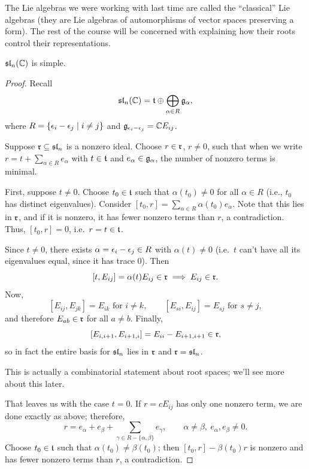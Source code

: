  The Lie algebras we were working with last time are called the
``classical'' Lie algebras (they are Lie algebras of automorphisms of vector
spaces preserving a form). The rest of the course will be concerned with
explaining how their roots control their representations.

\begin{proposition}
$\sl_n(\C)$ is simple.
\end{proposition}

\begin{proof}
Recall
\[
  \sl_n(\C) = \at \oplus \bigoplus_{\alpha \in R} \g_\alpha,
\]
where $R = \setc{\eps_i - \eps_j}{i \neq j}$ and $\g_{\eps_i - \eps_j} = \C E_{ij}$.

Suppose $\fr \subseteq \sl_n$ is a nonzero ideal. Choose $r \in \fr$,
$r \neq 0$, such that when we write $r = t + \sum_{\alpha \in R} e_\alpha$
with $t \in \at$ and $e_\alpha \in \g_\alpha$, the number of nonzero terms is
minimal.

First, suppose $t \neq 0$. Choose $t_0 \in \at$ such that $\alpha(t_0) \neq 0$
for all $\alpha \in R$ (i.e., $t_0$ has distinct eigenvalues). Consider
$[t_0, r] = \sum_{\alpha \in R} \alpha(t_0)e_\alpha$. Note that this lies in
$\fr$, and if it is nonzero, it has fewer nonzero terms than $r$, a
contradiction. Thus, $[t_0, r] = 0$, i.e.\ $r = t \in \at$.

Since $t \neq 0$, there exists $\alpha = \eps_i - \eps_j \in R$ with
$\alpha(t) \neq 0$ (i.e.\ $t$ can't have all its eigenvalues equal, since it
has trace $0$). Then
\[
  [t, E_{ij}] = \alpha(t)E_{ij} \in \fr \implies E_{ij} \in \fr.
\]
Now,
\[
  [E_{ij}, E_{jk}] = E_{ik} \text{ for } i \neq k, \qquad
  [E_{si}, E_{ij}] = E_{sj} \text{ for } s \neq j,
\]
and therefore $E_{ab} \in \fr$ for all $a \neq b$. Finally,
\[
  [E_{i,i+1}, E_{i+1,i}] = E_{ii} - E_{i+1,i+1} \in \fr,
\]
so in fact the entire basis for $\sl_n$ lies in $\fr$ and $\fr = \sl_n$.

\begin{remark}
This is actually a combinatorial statement about root spaces; we'll see more
about this later.
\end{remark}

That leaves us with the case $t = 0$. If $r = cE_{ij}$ has only one nonzero
term, we are done exactly as above; therefore,
\[
  r = e_\alpha + e_\beta + \sum_{\gamma \in R - \{\alpha, \beta\}} e_\gamma,
  \qquad \alpha \neq \beta,\ e_\alpha, e_\beta \neq 0.
\]
Choose $t_0 \in \at$ such that $\alpha(t_0) \neq \beta(t_0)$; then
$[t_0, r] - \beta(t_0)r$ is nonzero and has fewer nonzero terms than $r$, a
contradiction.
\end{proof}

